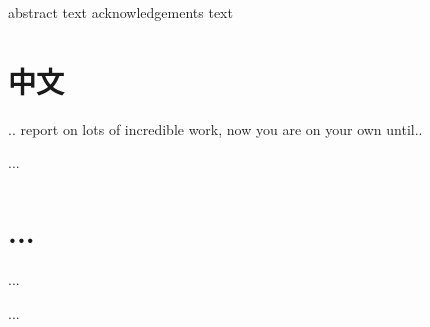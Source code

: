 \documentclass[11pt,a4paper,extrafontsizes,oldfontcommands,twoside]{dlutthesis}
\begin{document}
\frontmatter
\thetitlepage
\approvalpage
\asuabstract
abstract text
\asuacknowledgements
acknowledgements text
\tableofcontents
\mainmatter
\pagestyle{asu}
\chapter{中文} %
.. report on lots of incredible work, now you are on your
own until..
\printpagenotes
\begin{thebibliography}...\end{thebibliography}
\appendix
\chapter{...}
...
\begin{biosketch} ... \end{biosketch}
\end{document}
